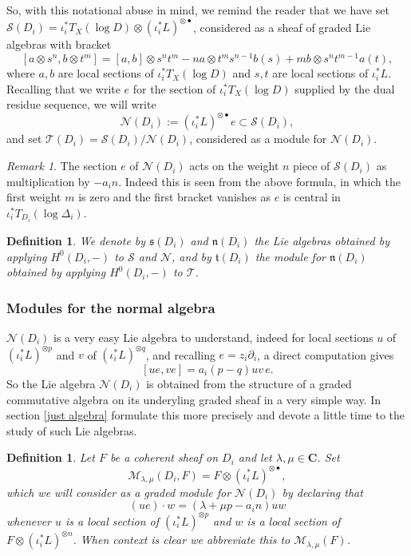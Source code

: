 \documentclass[12pt, oneside]{amsart}       %
\newtheorem{definition}[theorem]{Definition}
\theoremstyle{remark}
\newtheorem*{remark}{Remark}
\begin{document}
So, with this notational abuse in mind, we remind the reader that we have set $\mathcal{S}(D_i)=\iota_i^*T_X(\log D)\otimes(\iota_i^*L)^{\otimes\bullet}$, considered as a sheaf of graded Lie algebras with bracket $$[a\otimes s^n,b\otimes t^m]=[a,b]\otimes s^nt^m-na\otimes t^ms^{n-1}b(s)+mb\otimes s^nt^{m-1}a(t),$$
where $a,b$ are local sections of $\iota_i^*T_X(\log D)$ and $s,t$ are local sections of $\iota_i^*L$. Recalling that we write $e$ for the section of $\iota_i^*T_X(\log D)$ supplied by the dual residue sequence, we will write $$\mathcal{N}(D_i):=(\iota_i^*L)^{\otimes\bullet}e\subset \mathcal{S}(D_i),$$ and set $\mathcal{T}(D_i)=\mathcal{S}(D_i)/\mathcal{N}(D_i)$, considered as a module for $\mathcal{N}(D_i)$.




\begin{remark}\label{e wts} The section $e$ of $\mathcal{N}(D_i)$ acts on the weight $n$ piece of $\mathcal{S}(D_i)$ as multiplication by $-a_in$. Indeed this is seen from the above formula, in which the first weight $m$ is zero and the first bracket vanishes as $e$ is central in $\iota_i^*T_{D_i}(\log\Delta_i).$ \end{remark}

\begin{definition} We denote by $\mathfrak{s}(D_i)$ and $\mathfrak{n}(D_i)$ the Lie algebras obtained by applying $H^0(D_i,-)$ to $\mathcal{S}$ and $\mathcal{N}$, and by $\mathfrak{t}(D_i)$ the module for $\mathfrak{n}(D_i)$ obtained by applying $H^0(D_i,-)$ to $\mathcal{T}$. \end{definition} 

\subsubsection{Modules for the normal algebra}\label{norm alg brack} $\mathcal{N}(D_i)$ is a very easy Lie algebra to understand, indeed for local sections $u$ of $(\iota_i^*L)^{\otimes p}$ and $v$ of $(\iota_i^*L)^{\otimes q}$, and recalling $e=z_i\partial_i$, a direct computation gives $$[ue,ve]=a_i(p-q)uv\,e.$$ So the Lie algebra $\mathcal{N}(D_i)$ is obtained from the structure of a graded commutative algebra on its underyling graded sheaf in a very simple way. In section \ref{just algebra} formulate this more precisely and devote a little time to the study of such Lie algebras. 
\\
\begin{definition} Let $F$ be a coherent sheaf on $D_i$ and let $\lambda,\mu\in\mathbf C$. Set $$\mathcal{M}_{\lambda,\mu}(D_i,F)=F\otimes(\iota_i^*L)^{\otimes\bullet},$$ which we will consider as a graded module for $\mathcal{N}(D_i)$ by declaring that $$(ue)\cdot w=(\lambda+\mu p-a_i n)uw$$ whenever $u$ is a local section of $(\iota_i^*L)^{\otimes p}$ and $w$ is a local section of $F\otimes(\iota_i^*L)^{\otimes n}$. When context is clear we abbreviate this to $\mathcal{M}_{\lambda,\mu}(F)$.
\end{definition}
\end{document}
